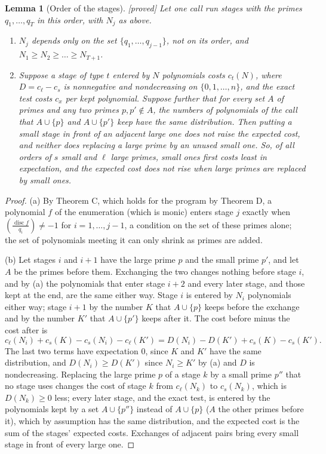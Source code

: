 \documentclass[10pt,a4paper]{article}
\DeclareMathOperator{\disc}{disc}
\newcommand{\leg}[2]{\left(\frac{#1}{#2}\right)}
\newcommand{\stproved}{\textsf{\small[proved]}\xspace}
\theoremstyle{plain}
\newtheorem{lemma}[proposition]{Lemma}
\theoremstyle{definition}
\begin{document}
\begin{lemma}[Order of the stages]\label{lem:order}\stproved
Let one call run stages with the primes $q_1,\dots,q_T$ in this order, with $N_j$ as above.
\begin{enumerate}[label=(\alph*)]
\item $N_j$ depends only on the set $\{q_1,\dots,q_{j-1}\}$, not on its order, and $N_1\ge N_2\ge\dots\ge N_{T+1}$.
\item Suppose a stage of type $t$ entered by $N$ polynomials costs $c_t(N)$, where $D=c_\ell-c_s$ is nonnegative and nondecreasing on $\{0,1,\dots,n\}$, and the exact
test costs $c_x$ per kept polynomial.  Suppose further that for every set $A$ of primes and any two primes $p,p'\notin A$, the numbers of polynomials of the call that
$A\cup\{p\}$ and $A\cup\{p'\}$ keep have the same distribution.  Then putting a small stage in front of an adjacent large one does not raise the expected cost, and
neither does replacing a large prime by an unused small one.  So, of all orders of $s$ small and $\ell$ large primes, small ones first costs least in expectation, and
the expected cost does not rise when large primes are replaced by small ones.
\end{enumerate}
\end{lemma}
\begin{proof}
(a) By Theorem C, which holds for the program by Theorem D, a polynomial $f$ of the enumeration (which is monic) enters stage $j$ exactly when
$\leg{\disc f}{q_i}\ne-1$ for $i=1,\dots,j-1$, a condition on the set of these primes alone; the set of polynomials meeting it can only shrink as primes are added.

(b) Let stages $i$ and $i+1$ have the large prime $p$ and the small prime $p'$, and let $A$ be the primes before them.  Exchanging the two changes nothing before stage
$i$, and by (a) the polynomials that enter stage $i+2$ and every later stage, and those kept at the end, are the same either way.  Stage $i$ is entered by $N_i$
polynomials either way; stage $i+1$ by the number $K$ that $A\cup\{p\}$ keeps before the exchange and by the number $K'$ that $A\cup\{p'\}$ keeps after it.  The cost
before minus the cost after is
\[
c_\ell(N_i)+c_s(K)-c_s(N_i)-c_\ell(K')=D(N_i)-D(K')+c_s(K)-c_s(K').
\]
The last two terms have expectation $0$, since $K$ and $K'$ have the same distribution, and $D(N_i)\ge D(K')$ since $N_i\ge K'$ by (a) and $D$ is nondecreasing.
Replacing the large prime $p$ of a stage $k$ by a small prime $p''$ that no stage uses changes the cost of stage $k$ from $c_\ell(N_k)$ to $c_s(N_k)$, which is
$D(N_k)\ge0$ less; every later stage, and the exact test, is entered by the polynomials kept by a set $A\cup\{p''\}$ instead of $A\cup\{p\}$ ($A$ the other primes
before it), which by assumption has the same distribution, and the expected cost is the sum of the stages' expected costs.  Exchanges of adjacent pairs bring every
small stage in front of every large one.
\end{proof}
\end{document}
